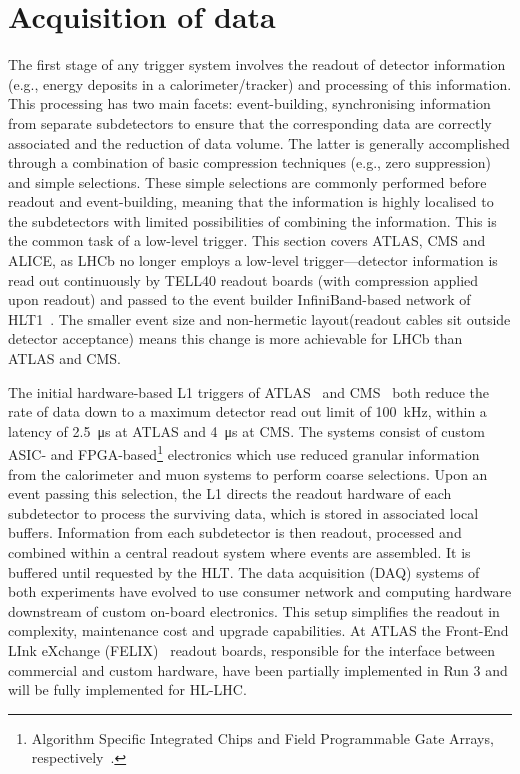 \section{Acquisition of data}
The first stage of any trigger system involves the readout of detector information (e.g.,  energy deposits in a calorimeter/tracker) and processing of this information. This processing has two main facets: event-building, synchronising information from separate subdetectors to ensure that the corresponding data are correctly associated and the reduction of data volume. The latter is generally accomplished through a combination of basic compression techniques (e.g., zero suppression) and simple selections. These simple selections are commonly performed before readout and event-building, meaning that the information is highly localised to the subdetectors with limited possibilities of combining the information. This is the common task of a low-level trigger. This section covers ATLAS, CMS and ALICE, as LHCb no longer employs a low-level trigger—detector information is read out continuously by TELL40 readout boards (with compression applied upon readout) and passed to the event builder InfiniBand-based network of HLT1~\cite{LHCb:2023hlw}. The smaller event size and non-hermetic layout(readout cables sit outside detector acceptance) means this change is more achievable for LHCb than ATLAS and CMS.


The initial hardware-based L1 triggers of ATLAS~\cite{ATLASRun3Detector} and CMS~\cite{cms2023development} both reduce the rate of data down to a maximum detector read out limit of \SI{100}{\kilo\hertz}, within a latency of \SI{2.5}{\micro\second} at ATLAS and \SI{4}{\micro\second} at CMS. The systems consist of custom ASIC- and FPGA-based\footnote{Algorithm Specific Integrated Chips and Field Programmable Gate Arrays, respectively~\cite{asics-fpgas}.} electronics which use reduced granular information from the calorimeter and muon systems to perform coarse selections. Upon an event passing this selection, the L1 directs the readout hardware of each subdetector to process the surviving data, which is stored in associated local buffers. Information from each subdetector is  then readout, processed and combined within a central readout system where events are assembled. It is buffered until requested by the HLT. The data acquisition (DAQ) systems of both experiments have evolved to use consumer network and computing hardware downstream of custom on-board electronics. This setup simplifies the readout in complexity, maintenance cost and upgrade capabilities. At ATLAS the Front-End LInk eXchange (FELIX)~\cite{ATLAS:FELIX} readout boards, responsible for the interface between commercial and custom hardware, have been partially implemented in Run 3 and will be fully implemented for HL-LHC.


